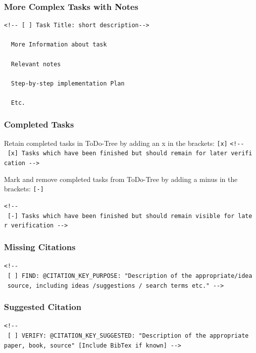 \documentclass[
  11pt,
  letterpaper,
]{book}
\begin{document}
\subsubsection*{More Complex Tasks with
Notes}\label{more-complex-tasks-with-notes}

\begin{verbatim}
<!-- [ ] Task Title: short description-->

  More Information about task

  Relevant notes

  Step-by-step implementation Plan

  Etc.
\end{verbatim}

\subsubsection*{Completed Tasks}\label{completed-tasks}

Retain completed tasks in ToDo-Tree by adding an x in the brackets:
\texttt{{[}x{]}}
\texttt{\textless{}!-\/-\ {[}x{]}\ Tasks\ which\ have\ been\ finished\ but\ should\ remain\ for\ later\ verification\ -\/-\textgreater{}}

Mark and remove completed tasks from ToDo-Tree by adding a minus in the
brackets: \texttt{{[}-{]}}

\texttt{\textless{}!-\/-\ {[}-{]}\ Tasks\ which\ have\ been\ finished\ but\ should\ remain\ visible\ for\ later\ verification\ -\/-\textgreater{}}

\subsubsection*{Missing Citations}\label{missing-citations}

\texttt{\textless{}!-\/-\ {[}\ {]}\ FIND:\ @CITATION\_KEY\_PURPOSE:\ "Description\ of\ the\ appropriate/idea\ source,\ including\ ideas\ /suggestions\ /\ search\ terms\ etc."\ -\/-\textgreater{}}

\subsubsection*{Suggested Citation}\label{suggested-citation}

\texttt{\textless{}!-\/-\ {[}\ {]}\ VERIFY:\ @CITATION\_KEY\_SUGGESTED:\ "Description\ of\ the\ appropriate\ paper,\ book,\ source"\ {[}Include\ BibTex\ if\ known{]}\ -\/-\textgreater{}}
\end{document}
